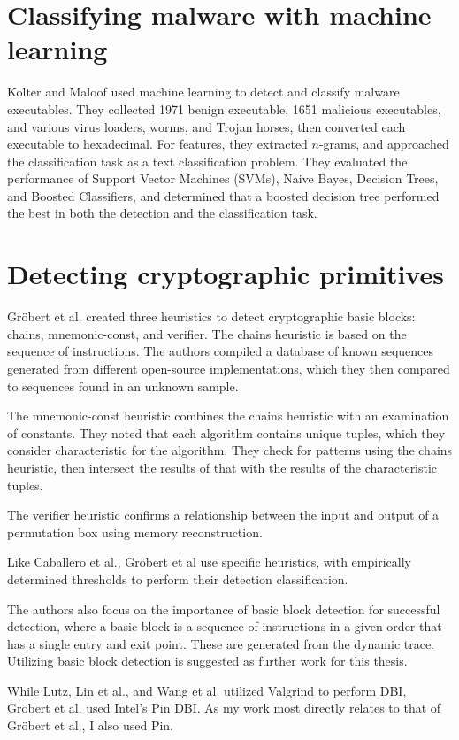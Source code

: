 \section{Classifying malware with machine learning}
Kolter and Maloof\cite{kolter} used machine learning to detect and classify malware executables.  They collected 1971 benign executable, 1651 malicious executables, and various virus loaders, worms, and Trojan horses, then converted each executable to hexadecimal.  For features, they extracted $n$-grams, and approached the classification task as a text classification problem.  They evaluated the performance of Support Vector Machines (SVMs), Naive Bayes, Decision Trees, and Boosted Classifiers, and determined that a boosted decision tree performed the best in both the detection and the classification task.

\section{Detecting cryptographic primitives}

Gr\"{o}bert et al. \cite{grobert} created three heuristics to detect cryptographic basic blocks: chains, mnemonic-const, and verifier.  The chains heuristic is based on the sequence of instructions.  The authors compiled a database of known sequences generated from different open-source implementations, which they then compared to sequences found in an unknown sample.

The mnemonic-const heuristic combines the chains heuristic with an examination of constants.  They noted that each algorithm contains unique tuples, which they consider characteristic for the algorithm.  They check for patterns using the chains heuristic, then intersect the results of that with the results of the characteristic tuples.

The verifier heuristic confirms a relationship between the input and output of a permutation box using memory reconstruction.

Like Caballero et al., Gr\"{o}bert et al use specific heuristics, with empirically determined thresholds to perform their detection classification.  

The authors also focus on the importance of basic block detection for successful detection, where a basic block is a sequence of instructions in a given order that has a single entry and exit point.  These are generated from the dynamic trace.  Utilizing basic block detection is suggested as further work for this thesis.

While Lutz, Lin et al., and Wang et al. utilized Valgrind to perform DBI, Gr\"{o}bert et al. used Intel's Pin\cite{pin} DBI.  As my work most directly relates to that of Gr\"{o}bert et al., I also used Pin.


